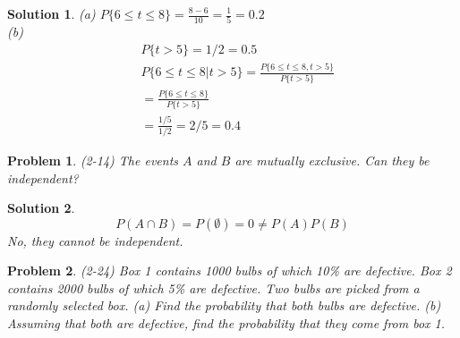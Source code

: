 \documentclass{article}
\newtheorem{problem}{Problem}[section]
\newtheorem{solution}{Solution}[section]
\begin{document}
		\begin{solution}
			(a) $P\{6\leq t\leq 8\}=\frac{8-6}{10}=\frac{1}{5}=0.2$\\
			(b)
			\begin{align*}
				&P\{t>5\}=1/2=0.5\\
				&P\{6\leq t\leq 8|t>5\}=\frac{P\{6\leq t\leq 8,t>5\}}{P\{t>5\}}\\
				&=\frac{P\{6\leq t\leq 8\}}{P\{t>5\}}\\
				&=\frac{1/5}{1/2}=2/5=0.4
			\end{align*}
		\end{solution}
		\begin{problem}
			(2-14) The events $A$ and $B$ are mutually exclusive. Can they be independent?
		\end{problem}
		\begin{solution}
			\begin{equation*}
				P(A\cap B)=P(\emptyset)=0\neq P(A)P(B)
			\end{equation*}
			No, they cannot be independent.
		\end{solution}
		\begin{problem}
			(2-24) Box 1 contains 1000 bulbs of which 10\% are defective. Box 2 contains 2000 bulbs of which 5\% are defective. Two bulbs are picked from a randomly selected box. (a) Find the probability that both bulbs are defective. (b) Assuming that both are defective, find the probability that they come from box 1.
		\end{problem}
\end{document}
